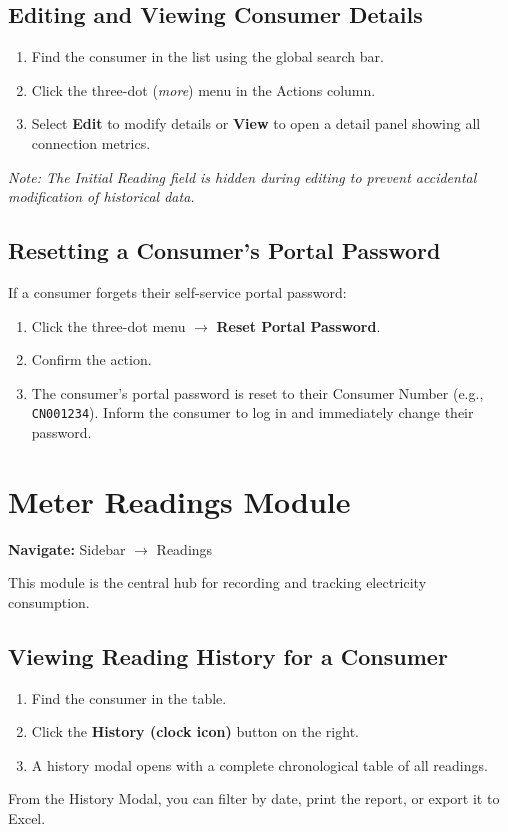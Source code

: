 \documentclass[12pt, a4paper]{report}
\begin{document}
\subsection{Editing and Viewing Consumer Details}
\begin{enumerate}
    \item Find the consumer in the list using the global search bar.
    \item Click the three-dot (\textit{more}) menu in the Actions column.
    \item Select \textbf{Edit} to modify details or \textbf{View} to open a detail panel showing all connection metrics.
\end{enumerate}
\textit{Note: The Initial Reading field is hidden during editing to prevent accidental modification of historical data.}

\subsection{Resetting a Consumer's Portal Password}
If a consumer forgets their self-service portal password:
\begin{enumerate}
    \item Click the three-dot menu $\rightarrow$ \textbf{Reset Portal Password}.
    \item Confirm the action.
    \item The consumer's portal password is reset to their Consumer Number (e.g., \texttt{CN001234}). Inform the consumer to log in and immediately change their password.
\end{enumerate}

\section{Meter Readings Module}

\textbf{Navigate:} Sidebar $\rightarrow$ Readings

This module is the central hub for recording and tracking electricity consumption.

\subsection{Viewing Reading History for a Consumer}
\begin{enumerate}
    \item Find the consumer in the table.
    \item Click the \textbf{History (clock icon)} button on the right.
    \item A history modal opens with a complete chronological table of all readings.
\end{enumerate}
From the History Modal, you can filter by date, print the report, or export it to Excel.
\end{document}
